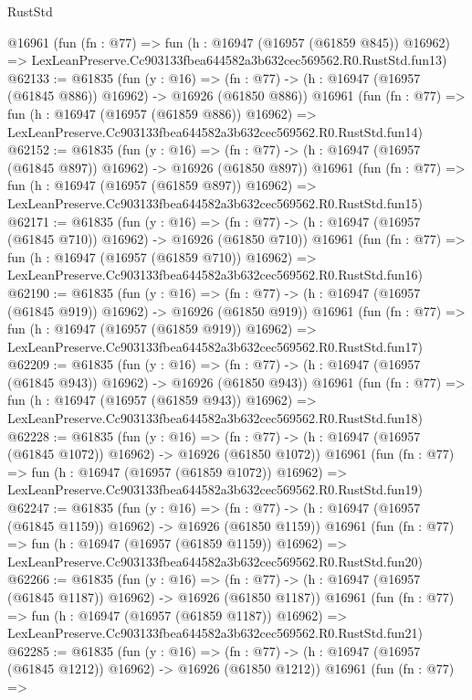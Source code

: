 \begin{lexlean}{RustStd}
\begin{coremodule}
    @16961
    (fun (fn : @77) =>
    fun (h : @16947 (@16957 (@61859 @845)) @16962) =>
    LexLeanPreserve.Cc903133fbea644582a3b632cec569562.R0.RustStd.fun13)
@62133 := @61835
    (fun (y : @16) =>
    (fn : @77) -> (h : @16947 (@16957 (@61845 @886)) @16962) -> @16926 (@61850 @886))
    @16961
    (fun (fn : @77) =>
    fun (h : @16947 (@16957 (@61859 @886)) @16962) =>
    LexLeanPreserve.Cc903133fbea644582a3b632cec569562.R0.RustStd.fun14)
@62152 := @61835
    (fun (y : @16) =>
    (fn : @77) -> (h : @16947 (@16957 (@61845 @897)) @16962) -> @16926 (@61850 @897))
    @16961
    (fun (fn : @77) =>
    fun (h : @16947 (@16957 (@61859 @897)) @16962) =>
    LexLeanPreserve.Cc903133fbea644582a3b632cec569562.R0.RustStd.fun15)
@62171 := @61835
    (fun (y : @16) =>
    (fn : @77) -> (h : @16947 (@16957 (@61845 @710)) @16962) -> @16926 (@61850 @710))
    @16961
    (fun (fn : @77) =>
    fun (h : @16947 (@16957 (@61859 @710)) @16962) =>
    LexLeanPreserve.Cc903133fbea644582a3b632cec569562.R0.RustStd.fun16)
@62190 := @61835
    (fun (y : @16) =>
    (fn : @77) -> (h : @16947 (@16957 (@61845 @919)) @16962) -> @16926 (@61850 @919))
    @16961
    (fun (fn : @77) =>
    fun (h : @16947 (@16957 (@61859 @919)) @16962) =>
    LexLeanPreserve.Cc903133fbea644582a3b632cec569562.R0.RustStd.fun17)
@62209 := @61835
    (fun (y : @16) =>
    (fn : @77) -> (h : @16947 (@16957 (@61845 @943)) @16962) -> @16926 (@61850 @943))
    @16961
    (fun (fn : @77) =>
    fun (h : @16947 (@16957 (@61859 @943)) @16962) =>
    LexLeanPreserve.Cc903133fbea644582a3b632cec569562.R0.RustStd.fun18)
@62228 := @61835
    (fun (y : @16) =>
    (fn : @77) -> (h : @16947 (@16957 (@61845 @1072)) @16962) -> @16926 (@61850 @1072))
    @16961
    (fun (fn : @77) =>
    fun (h : @16947 (@16957 (@61859 @1072)) @16962) =>
    LexLeanPreserve.Cc903133fbea644582a3b632cec569562.R0.RustStd.fun19)
@62247 := @61835
    (fun (y : @16) =>
    (fn : @77) -> (h : @16947 (@16957 (@61845 @1159)) @16962) -> @16926 (@61850 @1159))
    @16961
    (fun (fn : @77) =>
    fun (h : @16947 (@16957 (@61859 @1159)) @16962) =>
    LexLeanPreserve.Cc903133fbea644582a3b632cec569562.R0.RustStd.fun20)
@62266 := @61835
    (fun (y : @16) =>
    (fn : @77) -> (h : @16947 (@16957 (@61845 @1187)) @16962) -> @16926 (@61850 @1187))
    @16961
    (fun (fn : @77) =>
    fun (h : @16947 (@16957 (@61859 @1187)) @16962) =>
    LexLeanPreserve.Cc903133fbea644582a3b632cec569562.R0.RustStd.fun21)
@62285 := @61835
    (fun (y : @16) =>
    (fn : @77) -> (h : @16947 (@16957 (@61845 @1212)) @16962) -> @16926 (@61850 @1212))
    @16961
    (fun (fn : @77) =>

\end{coremodule}
\end{lexlean}
